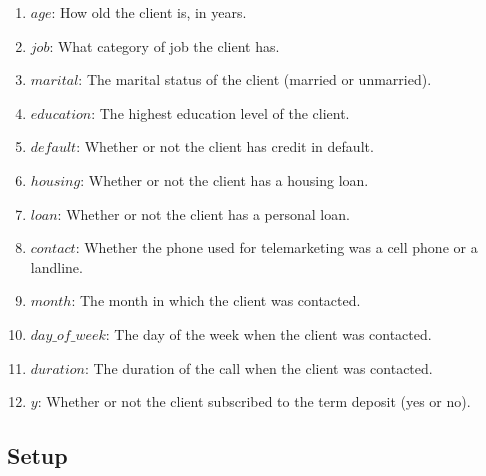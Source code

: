 \begin{enumerate}
    \item $age$: How old the client is, in years.
    \item $job$: What category of job the client has.
    \item $marital$: The marital status of the client (married or unmarried).
    \item $education$: The highest education level of the client.
    \item $default$: Whether or not the client has credit in default.
    \item $housing$: Whether or not the client has a housing loan.
    \item $loan$: Whether or not the client has a personal loan.
    \item $contact$: Whether the phone used for telemarketing was a cell phone or a landline.
    \item $month$: The month in which the client was contacted.
    \item $day\_of\_week$: The day of the week when the client was contacted.
    \item $duration$: The duration of the call when the client was contacted.
    \item $y$: Whether or not the client subscribed to the term deposit (yes or no).
\end{enumerate}

\begin{visualComponent}
\end{visualComponent}

\subsection{Setup}

